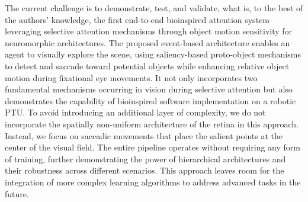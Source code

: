 The current challenge is to demonstrate, test, and validate, what is, to the best of the authors' knowledge, the first end-to-end bioinspired attention system leveraging selective attention mechanisms through object motion sensitivity for neuromorphic architectures. The proposed event-based architecture enables an agent to visually explore the scene, using saliency-based proto-object mechanisms to detect and saccade toward potential objects while enhancing relative object motion during fixational eye movements. 
It not only incorporates two fundamental mechanisms occurring in vision during selective attention but also demonstrates the capability of bioinspired software implementation on a robotic PTU.
To avoid introducing an additional layer of complexity, we do not incorporate the spatially non-uniform architecture of the retina in this approach. Instead, we focus on saccadic movements that place the salient points at the center of the visual field.
The entire pipeline operates without requiring any form of training, further demonstrating the power of hierarchical architectures and their robustness across different scenarios. This approach leaves room for the integration of more complex learning algorithms to address advanced tasks in the future.